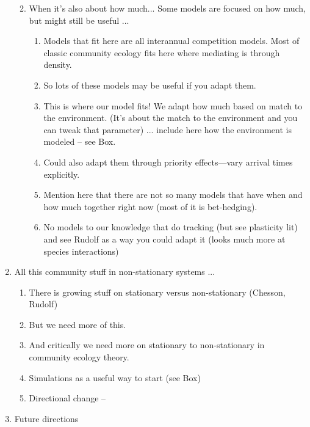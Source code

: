 \documentclass[11pt,letterpaper]{article}
\begin{document}
\begin{enumerate}
\begin{enumerate}
\begin{enumerate}
\end{enumerate}
\item When it's also about how much... Some models are focused on how much, but might still be useful ... 
\begin{enumerate}
\item Models that fit here are all interannual competition models. Most of classic community ecology fits here where mediating is through density.
\item So lots of these models may be useful if you adapt them. 
\item This is where our model fits! We adapt how much based on match to the environment. (It's about the match to the environment and you can tweak that parameter) ... include here how the environment is modeled -- see Box.  
\item Could also adapt them through priority effects---vary arrival times explicitly. 
\item Mention here that there are not so many models that have when and how much together right now (most of it is bet-hedging). 
\item No models to our knowledge that do tracking (but see plasticity lit) and see Rudolf as a way you could adapt it (looks much more at species interactions)
\end{enumerate}
\end{enumerate}
\item All this community stuff in non-stationary systems ... 
\begin{enumerate}
\item There is growing stuff on stationary versus non-stationary (Chesson, Rudolf)
\item But we need more of this. 
\item And critically we need more on stationary to non-stationary in community ecology theory. 
\item Simulations as a useful way to start (see Box)
\item Directional change -- 
\end{enumerate}
\item Future directions
\end{enumerate}



\end{document}
